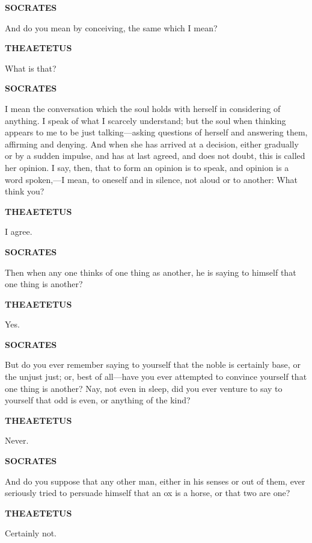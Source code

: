 \documentclass[11pt,letter]{article}
\begin{document}
\par \textbf{SOCRATES}
\par   And do you mean by conceiving, the same which I mean?

\par \textbf{THEAETETUS}
\par   What is that?

\par \textbf{SOCRATES}
\par   I mean the conversation which the soul holds with herself in considering of anything. I speak of what I scarcely understand; but the soul when thinking appears to me to be just talking—asking questions of herself and answering them, affirming and denying. And when she has arrived at a decision, either gradually or by a sudden impulse, and has at last agreed, and does not doubt, this is called her opinion. I say, then, that to form an opinion is to speak, and opinion is a word spoken,—I mean, to oneself and in silence, not aloud or to another:  What think you?

\par \textbf{THEAETETUS}
\par   I agree.

\par \textbf{SOCRATES}
\par   Then when any one thinks of one thing as another, he is saying to himself that one thing is another?

\par \textbf{THEAETETUS}
\par   Yes.

\par \textbf{SOCRATES}
\par   But do you ever remember saying to yourself that the noble is certainly base, or the unjust just; or, best of all—have you ever attempted to convince yourself that one thing is another? Nay, not even in sleep, did you ever venture to say to yourself that odd is even, or anything of the kind?

\par \textbf{THEAETETUS}
\par   Never.

\par \textbf{SOCRATES}
\par   And do you suppose that any other man, either in his senses or out of them, ever seriously tried to persuade himself that an ox is a horse, or that two are one?

\par \textbf{THEAETETUS}
\par   Certainly not.
\end{document}
